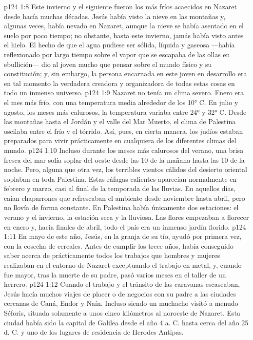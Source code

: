 \vs p124 1:8 \pc Este invierno y el siguiente fueron los más fríos acaecidos en Nazaret desde hacía muchas décadas. Jesús había visto la nieve en las montañas y, algunas veces, había nevado en Nazaret, aunque la nieve se había asentado en el suelo por poco tiempo; no obstante, hasta este invierno, jamás había visto antes el hielo. El hecho de que el agua pudiese ser sólida, líquida y gaseosa ---había reflexionado por largo tiempo sobre el vapor que se escapaba de las ollas en ebullición--- dio al joven mucho que pensar sobre el mundo físico y su constitución; y, sin embargo, la persona encarnada en este joven en desarrollo era en tal momento la verdadera creadora y organizadora de todas estas cosas en todo un inmenso universo.
\vs p124 1:9 Nazaret no tenía un clima severo. Enero era el mes más frío, con una temperatura media alrededor de los 10° C. En julio y agosto, los meses más calurosos, la temperatura variaba entre 24° y 32° C. Desde las montañas hasta el Jordán y el valle del Mar Muerto, el clima de Palestina oscilaba entre el frío y el tórrido. Así, pues, en cierta manera, los judíos estaban preparados para vivir prácticamente en cualquiera de los diferentes climas del mundo.
\vs p124 1:10 Incluso durante los meses más calurosos del verano, una brisa fresca del mar solía soplar del oeste desde las 10 de la mañana hasta las 10 de la noche. Pero, alguna que otra vez, los terribles vientos cálidos del desierto oriental soplaban en toda Palestina. Estas ráfagas calientes aparecían normalmente en febrero y marzo, casi al final de la temporada de las lluvias. En aquellos días, caían chaparrones que refrescaban el ambiente desde noviembre hasta abril, pero no llovía de forma constante. En Palestina había únicamente dos estaciones: el verano y el invierno, la estación seca y la lluviosa. Las flores empezaban a florecer en enero y, hacia finales de abril, todo el país era un inmenso jardín florido.
\vs p124 1:11 \pc En mayo de este año, Jesús, en la granja de su tío, ayudó por primera vez, con la cosecha de cereales. Antes de cumplir los trece años, había conseguido saber acerca de prácticamente todos los trabajos que hombres y mujeres realizaban en el entorno de Nazaret exceptuando el trabajo en metal, y, cuando fue mayor, tras la muerte de su padre, pasó varios meses en el taller de un herrero.
\vs p124 1:12 Cuando el trabajo y el tránsito de las caravanas escaseaban, Jesús hacía muchos viajes de placer o de negocios con su padre a las ciudades cercanas de Caná, Endor y Naín. Incluso siendo un muchacho visitó a menudo Séforis, situada solamente a unos cinco kilómetros al noroeste de Nazaret. Esta ciudad había sido la capital de Galilea desde el año 4 a. C. hasta cerca del año 25 d. C. y uno de los lugares de residencia de Herodes Antipas.
